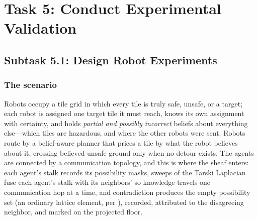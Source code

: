 \documentclass[11pt]{article}
\newif\ifshowcomments
\theoremstyle{definition}
\theoremstyle{remark}
\newcommand{\prompt}[1]{%
    \ifshowcomments
        ~\todo[inline, color=techgold!80, textcolor=black,caption={Task}]{{\bf Prompt:} #1}%
    \fi
}
\begin{document}
\section{Task 5: Conduct Experimental Validation}
\label{sec:task5}

\prompt{This task tests the algorithm's effectiveness in a physical setting, comparing it to
MARL to highlight advantages in task distribution under communication constraints.}

\subsection{Subtask 5.1: Design Robot Experiments}
\label{sec:subtask51}

\prompt{Plan UGV scenarios (e.g., searching and neutralizing targets) to test task allocation
under intermittent communication. Deliverable: Experiment design, included in Milestone 4's
report.}

\subsubsection{The scenario}

Robots occupy a tile grid in which every tile is truly \textsf{safe}, \textsf{unsafe}, or a
\textsf{target}; each robot is assigned one target tile it must reach, knows its own assignment
with certainty, and holds \emph{partial and possibly incorrect} beliefs about everything
else---which tiles are hazardous, and where the other robots were sent.
Robots route by a belief-aware planner that prices a tile by what the robot believes about it,
crossing believed-unsafe ground only when no detour exists.
The agents are connected by a communication topology, and this is where the sheaf enters: each
agent's stalk records its possibility masks, sweeps of the Tarski Laplacian fuse each agent's
stalk with its neighbors' so knowledge travels one communication hop at a time, and
contradiction produces the empty possibility set (an ordinary lattice element, per
), recorded, attributed to the disagreeing neighbor, and marked on the
projected floor.
\end{document}
